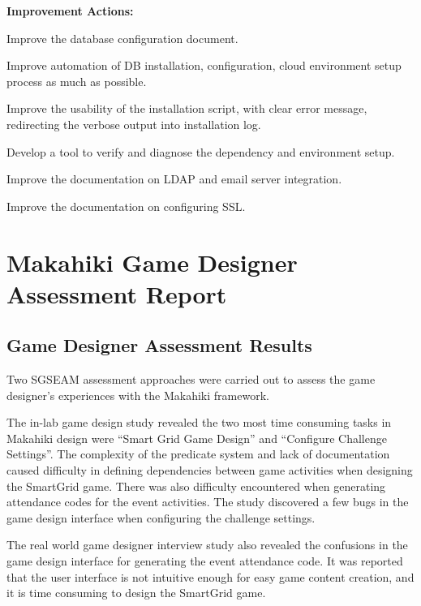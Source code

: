 \begin{table}[ht!]
\begin{shadebox}
{\bf Improvement Actions:}
\begin{compactenum}
\item Improve the database configuration document.
\item Improve automation of DB installation, configuration, cloud environment setup process as much as possible.
\item Improve the usability of the installation script, with clear error message, redirecting the verbose output into installation log.
\item Develop a tool to verify and diagnose the dependency and environment setup.
\item Improve the documentation on LDAP and email server integration.
\item Improve the documentation on configuring SSL.
\end{compactenum}
\end{shadebox}
\caption{SGSEAM Improvement Action Report from System Admin's Perspective}
\label{table:sysadmin-report}
\end{table}

\section{Makahiki Game Designer Assessment Report}

\subsection{Game Designer Assessment Results}

Two SGSEAM assessment approaches were carried out to assess the game designer's experiences with the Makahiki framework. 

The in-lab game design study revealed the two most time consuming tasks in Makahiki design were ``Smart Grid Game Design'' and ``Configure Challenge Settings''. The complexity of the predicate system and lack of documentation caused difficulty in defining dependencies between game activities when designing the SmartGrid game. There was also difficulty encountered when generating attendance codes for the event activities. The study discovered a few bugs in the game design interface when configuring the challenge settings.

The real world game designer interview study also revealed the confusions in the game design interface for generating the event attendance code. It was reported that the user interface is not intuitive enough for easy game content creation, and it is time consuming to design the SmartGrid game.

